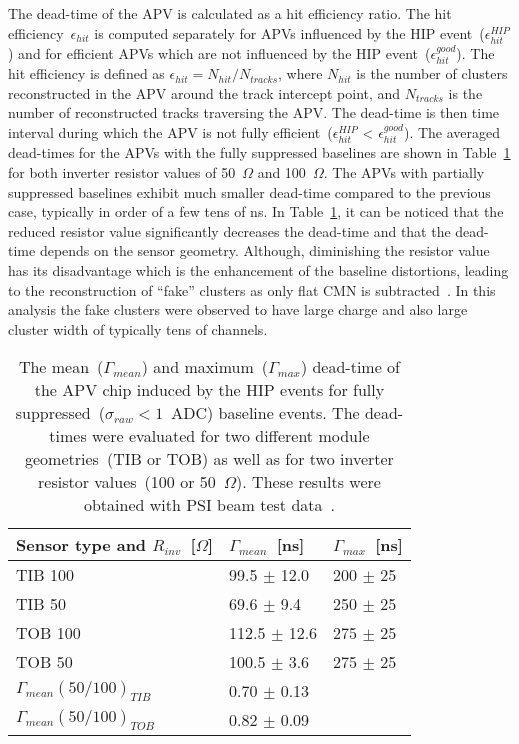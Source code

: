 The dead-time of the APV is calculated as a hit efficiency ratio. The hit efficiency~$\epsilon_{hit}$ is computed separately for APVs influenced by the HIP event~($\epsilon_{hit}^{HIP}$) and for efficient APVs which are not influenced by the HIP event~($\epsilon_{hit}^{good}$). The hit efficiency is defined as $\epsilon_{hit} = N_{hit}/N_{tracks}$, where $N_{hit}$ is the number of clusters reconstructed in the APV around the track intercept point, and $N_{tracks}$ is the number of reconstructed tracks traversing the APV. The dead-time is then time interval during which the APV is not fully efficient~($\epsilon_{hit}^{HIP}$ < $\epsilon_{hit}^{good}$). The averaged dead-times for the APVs with the fully suppressed baselines are shown in Table~\ref{tab:tableDeadtimes} for both inverter resistor values of 50~$\Omega$ and 100~$\Omega$. The APVs with partially suppressed baselines exhibit much smaller dead-time compared to the previous case, typically in order of a few tens of ns. In Table~\ref{tab:tableDeadtimes}, it can be noticed that the reduced resistor value significantly decreases the dead-time and that the dead-time depends on the sensor geometry. Although, diminishing the resistor value has its disadvantage which is the enhancement of the baseline distortions, leading to the reconstruction of ``fake'' clusters as only flat CMN is subtracted~\cite{Bainbridge:2004jc}. In this analysis the fake clusters were observed to have large charge and also large cluster width of typically tens of channels. 



\begin{table}[h]
\begin{center}
\begin{tabular}{|l|l|l|}
\hline
Sensor type and $R_{inv}$~[$\Omega$] & $\Gamma_{mean}$~[ns]  & $\Gamma_{max}$~[ns] \\
\hline
\hline
TIB 100 & 99.5 $\pm$ 12.0 & 200 $\pm$ 25 \\
TIB 50 & 69.6 $\pm$ 9.4 & 250 $\pm$ 25 \\
TOB 100 & 112.5 $\pm$ 12.6 & 275 $\pm$ 25 \\
TOB 50 & 100.5 $\pm$ 3.6 & 275 $\pm$ 25 \\
\hline
$\Gamma_{mean} (50/100)_{TIB}$&  0.70 $\pm$ 0.13  & \\
$\Gamma_{mean} (50/100)_{TOB}$&  0.82 $\pm$ 0.09 & \\
\hline
\end{tabular}
\caption[Table caption text]{The mean~($\Gamma_{mean}$) and maximum~($\Gamma_{max}$) dead-time of the APV chip induced by the HIP events for fully suppressed~($\sigma_{raw}<1$~ADC) baseline events. The dead-times were evaluated for two different module geometries~(TIB or TOB) as well as for two inverter resistor values~(100 or 50~$\Omega$). These results were obtained with PSI beam test data~\cite{Bainbridge:2004jc}. }
\label{tab:tableDeadtimes}
\end{center}
\end{table}



